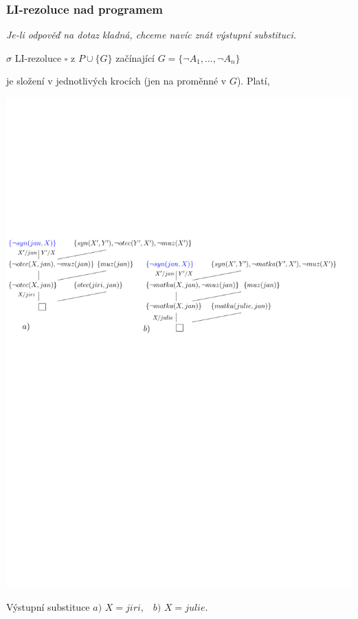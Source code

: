     
    
    \subsubsection*{LI-rezoluce nad programem}
    {\it Je-li odpověď na dotaz kladná, chceme navíc znát výstupní substituci.}
    \medskip
    
     $\sigma$ LI-rezoluce $\square$ z $P\cup\{G\}$ začínající $G=\{\neg A_1,\dots,\neg A_n\}$
    \smallskip
    
    je složení  v jednotlivých krocích (jen na proměnné v $G$). Platí,
    \vspace{-2mm}
    
    \vspace{-2mm}
    
    \centerline{\includegraphics[scale=0.63]{files/rezolucePLprogramLI}}
    \bigskip
    
    Výstupní substituce $a)$ $X=jiri$,\ \ $b)$ $X=julie$.
    
    



